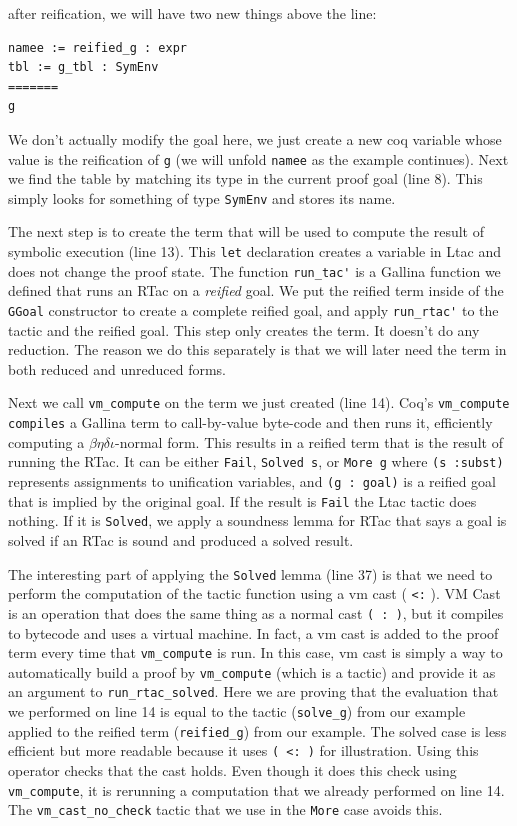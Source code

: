 \documentclass{puthesis}
\begin{document}
after reification, we will have two new things above the line:

\begin{lstlisting}
namee := reified_g : expr
tbl := g_tbl : SymEnv
=======
g
\end{lstlisting}

We don't actually modify the goal here, we just create a new coq
variable whose value is the reification of \lstinline|g| (we will
unfold \lstinline|namee| as the example continues). Next we find
the table by matching its type in the current proof goal (line
8). This simply looks for something of type \lstinline|SymEnv| and
stores its name.

The next step is to create the term that will be used to compute the
result of symbolic execution (line 13). This \lstinline|let|
declaration creates a variable in Ltac and does not change the proof
state.  The function \lstinline|run_tac'| is a Gallina function we
defined that runs an RTac on a \emph{reified} goal. We put the reified
term inside of the \lstinline|GGoal| constructor to create a complete
reified goal, and apply \lstinline|run_rtac'| to the tactic and the
reified goal.  This step only creates the term. It doesn't do any
reduction. The reason we do this separately is that we will later need
the term in both reduced and unreduced forms.

Next we call \lstinline|vm_compute| on the term we just created (line
14). Coq's \lstinline|vm_compute compiles| a Gallina term to call-by-value
byte-code and then runs it, efficiently computing a
$\beta\eta\delta\iota$-normal form. This results in a reified term that
is the result of running the RTac. It can be either \lstinline|Fail|,
\lstinline|Solved s|, or \lstinline|More g| where 
\lstinline|(s :subst)| represents assignments to unification variables, and
\lstinline|(g : goal)| is a reified goal that is implied by the
original goal. If the result is \lstinline|Fail| the Ltac tactic does
nothing. If it is \lstinline|Solved|, we apply a soundness lemma for
RTac that says a goal is solved if an RTac is sound and produced a
solved result. 

The interesting part of applying the \lstinline|Solved|
lemma (line 37) is that we need to perform the computation of the
tactic function using a vm cast ( \lstinline|<:| ). VM Cast is an
operation that does the same thing as a normal cast \lstinline|( : )|,
but it compiles to bytecode and uses a virtual machine. In fact, a vm
cast is added to the proof term every time that \lstinline|vm_compute|
is run. In this case, vm cast is simply a way to automatically build a
proof by \lstinline|vm_compute| (which is a tactic) and provide it as
an argument to \lstinline|run_rtac_solved|. Here we are proving that
the evaluation that we performed on line 14 is equal to the tactic
(\lstinline|solve_g|) from our example applied to the reified term
(\lstinline|reified_g|) from our example. 
The solved case is less efficient but more readable because it uses
\lstinline|( <: )| for illustration. Using this operator checks that
the cast holds. Even though it does this check using
\lstinline|vm_compute|, it is rerunning a computation that we already
performed on line 14. The \lstinline|vm_cast_no_check| tactic that we
use in the \lstinline|More| case avoids this.
\end{document}

